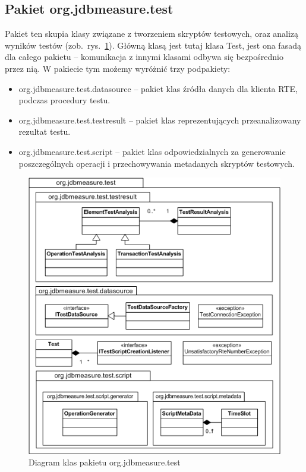 \subsection{Pakiet org.jdbmeasure.test}
Pakiet ten skupia klasy związane z tworzeniem skryptów testowych, oraz analizą wyników testów (zob.~rys.~\ref{rys:uml07}).
Główną klasą jest tutaj klasa Test, jest ona fasadą dla całego pakietu -- komunikacja z innymi klasami odbywa się bezpośrednio
przez nią. W pakiecie tym możemy wyróżnić trzy podpakiety:
\begin{itemize}
\item org.jdbmeasure.test.datasource -- pakiet klas źródła danych dla klienta RTE, podczas procedury testu.
\item org.jdbmeasure.test.testresult -- pakiet klas reprezentujących przeanalizowany rezultat testu.
\item org.jdbmeasure.test.script -- pakiet klas odpowiedzialnych za generowanie poszczególnych operacji i 
przechowywania metadanych skryptów testowych.
\end{itemize}
\begin{figure}[h]
\begin{center}
\includegraphics[width=0.8\linewidth]{figures/uml07.png}
\end{center}
\caption{Diagram klas pakietu org.jdbmeasure.test}\label{rys:uml07}
\end{figure}

